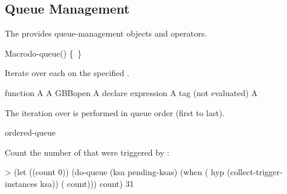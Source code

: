 \documentclass[10pt,twoside,english,pdftex]{article}
\begin{document}

\T\markright{}%
\T\pagestyle{plain}
\T\clearpage
\W{}
\T\pagestyle{fancy}
\T\thispagestyle{fancybottom}
\T\global\def\fnlastname{ }%
\subsection{Queue Management}
\label{sec:queue}%

%
%
%
The   provides queue-management objects and
operators.

\W\entities
\T\clearpage


\begin{functiondoc}{Macro}{do-queue}{()
    \superstar{} 
    \mbox{\{ \vbar{} \}\superstar}}
%
%

\fnsyntax

\fnpurpose Iterate over each  on the
specified .

\fnpackage {}

\fnmodule {}

\fnargs
\begin{args}{function}
\arg[var] A 
\arg[queue] A GBBopen 
\arg[declaration] A declare expression
\arg[tag] A  tag (not evaluated)
\arg[form] A 
\end{args}

\fndescription The iteration over  is performed
in queue order (first to last).

\begin{alsos}{ordered-queue}
\also[queue]
\end{alsos}

\fnexample
{}%
%
%
%
Count the number of  that were triggered by :
%
\W\supp
\begin{example}
> (let ((count 0))
    (do-queue (ksa pending-ksas)
      (when ( hyp (collect-trigger-instances ksa))
        ( count)))
     count)
31
\end{example}

\end{functiondoc}
\end{document}

